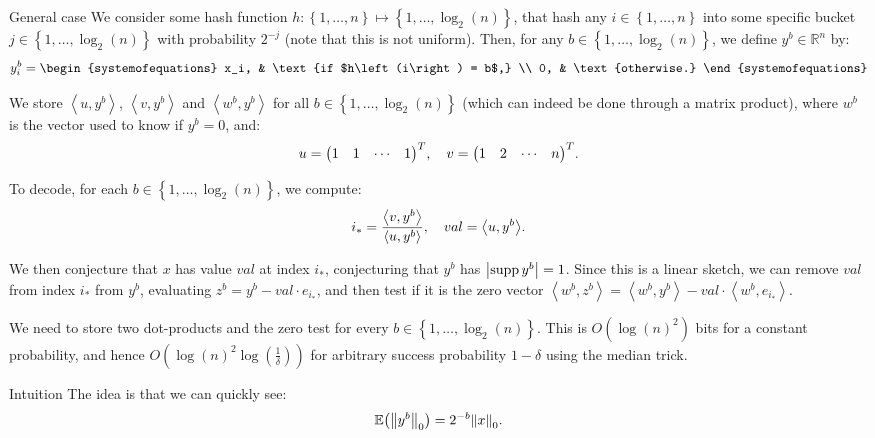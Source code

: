 \documentclass[a4paper]{article}
\begin{document}
\begin{parag}{General case}
    We consider some hash function $h: \left\{1, \ldots, n\right\} \mapsto \left\{1, \ldots, \log_{2}\left(n\right)\right\}$, that hash any $i \in \left\{1, \ldots, n\right\}$ into some specific bucket $j \in \left\{1, \ldots, \log_{2}\left(n\right)\right\}$ with probability $2^{-j}$ (note that this is not uniform). Then, for any $b \in \left\{1, \ldots, \log_{2}\left(n\right)\right\}$, we define $y^b \in \mathbb{R}^n$ by:
    \[y^b_i = \begin{systemofequations} x_i, & \text{if $h\left(i\right) = b$,} \\ 0, & \text{otherwise.} \end{systemofequations}\]

    We store $\left\langle u, y^b \right\rangle$, $\left\langle v, y^b \right\rangle$ and $\left\langle w^b, y^b \right\rangle$ for all $b \in \left\{1, \ldots, \log_{2}\left(n\right)\right\}$ (which can indeed be done through a matrix product), where $w^b$ is the vector used to know if $y^b = 0$, and:
    \[u = \begin{pmatrix} 1 & 1 & \cdots & 1 \end{pmatrix}^T, \mathspace v =\begin{pmatrix} 1 & 2 & \cdots & n \end{pmatrix}^T.\] 

    To decode, for each $b \in \left\{1, \ldots, \log_{2}\left(n\right)\right\}$, we compute: 
    \[i_* = \frac{\left\langle v, y^b \right\rangle}{\left\langle u, y^b \right\rangle}, \mathspace val = \left\langle u, y^b \right\rangle.\]
    
    We then conjecture that $x$ has value $val$ at index $i_*$, conjecturing that $y^b$ has $\left|\supp y^b\right| = 1$. Since this is a linear sketch, we can remove $val$ from index $i_*$ from $y^b$, evaluating $z^b = y^b - val\cdot e_{i_*}$, and then test if it is the zero vector $\left\langle w^b, z^b \right\rangle = \left\langle w^b, y^b \right\rangle - val\cdot \left\langle w^b, e_{i_*} \right\rangle$. 
    
    We need to store two dot-products and the zero test for every $b \in \left\{1, \ldots, \log_{2}\left(n\right)\right\}$. This is $O\left(\log\left(n\right)^2\right)$ bits for a constant probability, and hence $O\left(\log\left(n\right)^2 \log\left(\frac{1}{\delta}\right)\right)$ for arbitrary success probability $1 - \delta$ using the median trick.

    \begin{subparag}{Intuition}
        The idea is that we can quickly see: 
        \[\exval\left(\left\|y^b\right\|_0\right) = 2^{-b} \left\|x\right\|_0.\]
        

\end{subparag}
\end{parag}
\end{document}
